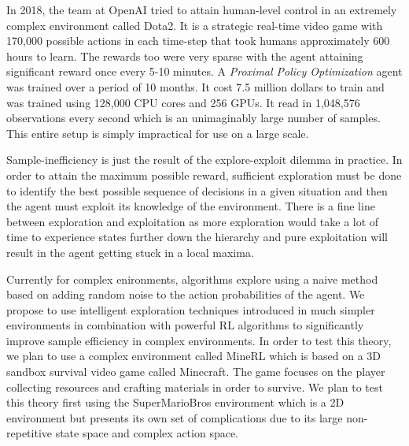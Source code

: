 \documentclass[12pt,a4paper]{article}
\begin{document}
In 2018, the team at OpenAI tried to attain human-level control
in an extremely complex environment called Dota2. It is a 
strategic real-time video game with 170,000 possible actions in each
time-step that took humans approximately 600 hours to learn. The rewards 
too were very sparse with the agent attaining significant reward once 
every 5-10 minutes. A \textit{Proximal Policy Optimization}
agent was trained over a period of 10 months. It cost 7.5 million 
dollars to train and was trained using
128,000 CPU cores and 256 GPUs. It read in 1,048,576 observations 
every second which is an unimaginably large number of samples. 
This entire setup is simply impractical for use on a large scale.

Sample-inefficiency is just the result of the explore-exploit dilemma 
in practice. In order to attain the maximum possible reward, sufficient
exploration must be done to identify the best possible sequence of decisions
in a given situation and then the agent must exploit its knowledge of the environment.
There is a fine line between exploration and exploitation as more exploration
would take a lot of time to experience states further down the hierarchy and pure 
exploitation will result in the agent getting stuck in a local maxima. 

Currently for complex enironments, algorithms 
explore using a naive method based on adding random noise to the action 
probabilities of the agent. We propose to use intelligent exploration 
techniques introduced in much simpler environments in combination with 
powerful RL algorithms to significantly improve sample efficiency in 
complex environments. In order to test this theory, we plan to use a complex
environment called MineRL which is based on a 3D sandbox survival video game
called Minecraft. The game focuses on the player collecting resources and crafting materials
in order to survive. We plan to test this theory first using the SuperMarioBros 
environment which is a 2D environment but presents its own set of complications 
due to its large non-repetitive state space and complex action space.
\end{document}
